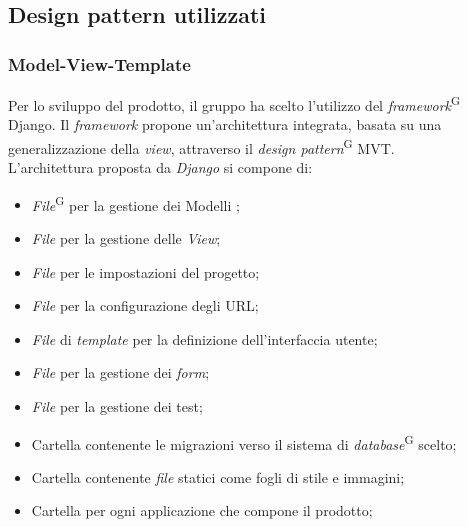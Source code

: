 \documentclass[5pt]{article}
\begin{document}
	\subsection{Design pattern utilizzati}
			\subsubsection{Model-View-Template}
			Per lo sviluppo del prodotto, il gruppo ha scelto l'utilizzo del \textit{framework}\textsuperscript{G} Django. Il \textit{framework} propone un'architettura integrata,
			basata su una generalizzazione della \textit{view}, attraverso il \textit{design pattern}\textsuperscript{G} MVT. \\
			L'architettura proposta da \textit{Django} si compone di:
			\begin{itemize}
			\item \textit{File}\textsuperscript{G} per la gestione dei Modelli ;
			\item \textit{File} per la gestione delle \textit{View};
			\item \textit{File} per le impostazioni del progetto;
			\item \textit{File} per la configurazione degli URL;
			\item \textit{File} di \textit{template} per la definizione dell'interfaccia utente;
			\item \textit{File} per la gestione dei \textit{form}; 
			\item \textit{File} per la gestione dei test;
			\item Cartella contenente le migrazioni verso il sistema di \textit{database}\textsuperscript{G} scelto;
			\item Cartella contenente \textit{file} statici come fogli di stile e immagini;
			\item Cartella per ogni applicazione che compone il prodotto;
			\end{itemize}
\end{document}
